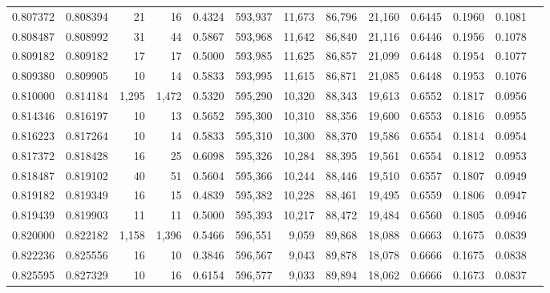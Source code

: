 \begin{tabular}{rrrrrrrrrrrrr}
0.807372 & 0.808394 &     21 &    16 &                                     0.4324 & 593,937 &  11,673 &  86,796 &  21,160 & 0.6445 & 0.1960 & 0.1081 \\
0.808487 & 0.808992 &     31 &    44 &                                     0.5867 & 593,968 &  11,642 &  86,840 &  21,116 & 0.6446 & 0.1956 & 0.1078 \\
0.809182 & 0.809182 &     17 &    17 &                                     0.5000 & 593,985 &  11,625 &  86,857 &  21,099 & 0.6448 & 0.1954 & 0.1077 \\
0.809380 & 0.809905 &     10 &    14 &                                     0.5833 & 593,995 &  11,615 &  86,871 &  21,085 & 0.6448 & 0.1953 & 0.1076 \\
0.810000 & 0.814184 &  1,295 & 1,472 &                                     0.5320 & 595,290 &  10,320 &  88,343 &  19,613 & 0.6552 & 0.1817 & 0.0956 \\
0.814346 & 0.816197 &     10 &    13 &                                     0.5652 & 595,300 &  10,310 &  88,356 &  19,600 & 0.6553 & 0.1816 & 0.0955 \\
0.816223 & 0.817264 &     10 &    14 &                                     0.5833 & 595,310 &  10,300 &  88,370 &  19,586 & 0.6554 & 0.1814 & 0.0954 \\
0.817372 & 0.818428 &     16 &    25 &                                     0.6098 & 595,326 &  10,284 &  88,395 &  19,561 & 0.6554 & 0.1812 & 0.0953 \\
0.818487 & 0.819102 &     40 &    51 &                                     0.5604 & 595,366 &  10,244 &  88,446 &  19,510 & 0.6557 & 0.1807 & 0.0949 \\
0.819182 & 0.819349 &     16 &    15 &                                     0.4839 & 595,382 &  10,228 &  88,461 &  19,495 & 0.6559 & 0.1806 & 0.0947 \\
0.819439 & 0.819903 &     11 &    11 &                                     0.5000 & 595,393 &  10,217 &  88,472 &  19,484 & 0.6560 & 0.1805 & 0.0946 \\
0.820000 & 0.822182 &  1,158 & 1,396 &                                     0.5466 & 596,551 &   9,059 &  89,868 &  18,088 & 0.6663 & 0.1675 & 0.0839 \\
0.822236 & 0.825556 &     16 &    10 &                                     0.3846 & 596,567 &   9,043 &  89,878 &  18,078 & 0.6666 & 0.1675 & 0.0838 \\
0.825595 & 0.827329 &     10 &    16 &                                     0.6154 & 596,577 &   9,033 &  89,894 &  18,062 & 0.6666 & 0.1673 & 0.0837 \\

\end{tabular}
